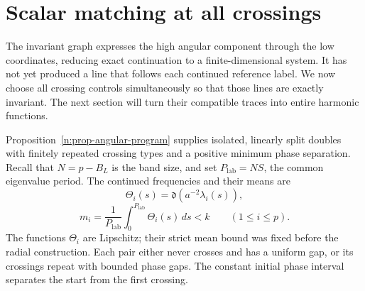 \section{Scalar matching at all crossings}
\label{n:sec-matching-growth}

The invariant graph expresses the high angular component through the low
coordinates, reducing exact continuation to a finite-dimensional system.
It has not yet produced a line that follows each
continued reference label.  We now choose all crossing controls
simultaneously so that those lines are exactly invariant. The next section
will turn their compatible traces into entire harmonic functions.

Proposition~\ref{n:prop-angular-program} supplies isolated, linearly
split doubles with finitely repeated crossing types and a positive minimum
phase separation. Recall that $N=p-B_L$ is the band size, and set
$P_{\mathrm{lab}}=NS$, the common eigenvalue period. The continued frequencies and their means are
\begin{equation}
 \Theta_i(s)=\mathfrak d(a^{-2}\lambda_i(s)),
 \label{n:eq-continued-frequency}
\end{equation}
\begin{equation}
 m_i=\frac1{P_{\mathrm{lab}}}\int_0^{P_{\mathrm{lab}}}\Theta_i(s)\,ds<k
 \qquad(1\le i\le p).
 \label{n:eq-subcritical-means}
\end{equation}
The functions $\Theta_i$ are Lipschitz; their strict mean bound was
fixed before the radial construction. Each pair either never crosses and
has a uniform gap, or its crossings repeat with bounded phase gaps.
The constant initial phase interval separates the start from the first
crossing.

